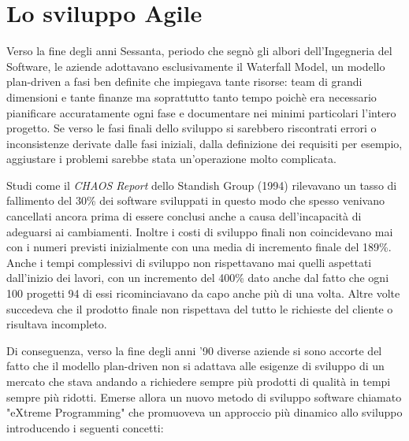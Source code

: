 \documentclass[target=bach,aauheader=,style=]{thud}
\begin{document}
\section{Lo sviluppo Agile}

Verso la fine degli anni Sessanta, periodo che segnò gli albori dell'Ingegneria del Software, le aziende adottavano esclusivamente il Waterfall Model,
un modello plan-driven a fasi ben definite che impiegava tante risorse: team di grandi dimensioni e tante finanze ma soprattutto tanto tempo
poichè era necessario pianificare accuratamente ogni fase e documentare nei minimi particolari l'intero progetto. Se verso le fasi finali dello
sviluppo si sarebbero riscontrati errori o inconsistenze derivate dalle fasi iniziali, dalla definizione dei requisiti per esempio, aggiustare i
problemi sarebbe stata un'operazione molto complicata.
\par Studi come il \textit{CHAOS Report}\cite{standish1994chaos} dello Standish Group (1994) rilevavano un tasso di fallimento del 30\% dei software
sviluppati in questo modo che spesso venivano cancellati ancora prima di essere conclusi anche a causa dell'incapacità di adeguarsi ai cambiamenti.
Inoltre i costi di sviluppo finali non coincidevano mai con i numeri previsti inizialmente con una media di incremento finale del 189\%.
Anche i tempi complessivi di sviluppo non rispettavano mai quelli aspettati dall'inizio dei lavori, con un incremento del 400\% dato anche dal
fatto che ogni 100 progetti 94 di essi ricominciavano da capo anche più di una volta.
Altre volte succedeva che il prodotto finale non rispettava del tutto le richieste del cliente o risultava incompleto.
\par Di conseguenza, verso la fine degli anni '90 diverse aziende si sono accorte del fatto che il modello plan-driven non si adattava alle esigenze di sviluppo di un
mercato che stava andando a richiedere sempre più prodotti di qualità in tempi sempre più ridotti.
Emerse allora un nuovo metodo di sviluppo software chiamato "eXtreme Programming" che promuoveva un approccio più dinamico allo sviluppo introducendo i seguenti concetti:
\end{document}
